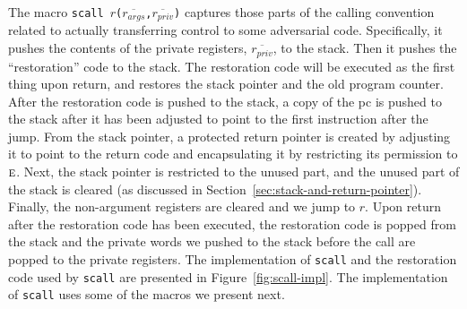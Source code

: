 \documentclass[format=acmsmall, review=true, screen=true]{acmart}
\renewcommand{\figurename}{Figure}
\newcommand{\var}[1]{\mathit{#1}}
\newcommand{\plainperm}[1]{\textsc{#1}}
\newcommand{\entry}{\plainperm{e}}
\newenvironment{toplas}%
    {\color{OliveGreen}}{}
\begin{document}
\begin{toplas}
The macro \texttt{scall
    $r$($\overline{r_{\var{args}}}$,$\overline{r_{\var{priv}}}$)} captures
those parts of the calling convention related to actually transferring control
to some adversarial code. Specifically, it pushes the contents of the private
registers, $\overline{r_{\var{priv}}}$, to the stack. Then it pushes the
``restoration'' code to the stack. The restoration code will be executed as the
first thing upon return, and restores the stack pointer and the old program
counter. After the restoration code is pushed to the stack, a copy of the pc is
pushed to the stack after it has been adjusted to point to the first instruction
after the jump. From the stack pointer, a protected return pointer is created by
adjusting it to point to the return code and encapsulating it by restricting its
permission to $\entry$. Next, the stack pointer is restricted to the unused
part, and the unused part of the stack is cleared (as discussed in
Section~\ref{sec:stack-and-return-pointer}). Finally, the non-argument registers
are cleared and we jump to $r$. Upon return after the restoration code has been
executed, the restoration code is popped from the stack and the private words we
pushed to the stack before the call are popped to the private registers. The
implementation of \texttt{scall} and the restoration code used by
\texttt{scall} are presented in \figurename~\ref{fig:scall-impl}. The implementation of \texttt{scall} uses
some of the macros we present next.


\end{toplas}
\end{document}

